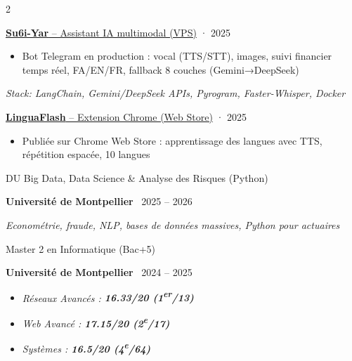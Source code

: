 \documentclass[7pt,a4paper,withhyper]{altacv}
\renewcommand{\cvevent}[4]{%
  {\large\color{emphasis}\raggedright #1\par}
  \smallskip\normalsize
  \ifstrequal{#2}{}{}{%
    \textbf{\color{accent}#2}%
  }%
  \ifstrequal{#4}{}{}{%
    \ifstrequal{#2}{}{}{\hspace{1.5em}}%
    {\small\cvLocationMarker~#4}%
  }%
  \ifstrequal{#3}{}{}{%
    \hfill{\small\cvDateMarker~#3}%
  }\par
}
\providecommand{\cvgithub}{github-username}
\begin{document}
\begin{paracol}{2}
{\large\color{emphasis}\raggedright\href{https://github.com/\cvgithub/su6i-yar}{\textbf{Su6i-Yar} -- Assistant IA multimodal (VPS)} {\small\color{LightGrey}· 2025}\par}
\vspace{0.1em}
\begin{itemize}[leftmargin=1.25em, nosep]
\item \justifying Bot Telegram en production : vocal (TTS/STT), images, suivi financier temps réel, FA/EN/FR, fallback 8 couches (Gemini→DeepSeek)
\end{itemize}
\noindent\textit{\small Stack: LangChain, Gemini/DeepSeek APIs, Pyrogram, Faster-Whisper, Docker}\par
\vspace{0.1em}\par\vspace{0.1em}

{\large\color{emphasis}\raggedright\href{https://github.com/\cvgithub/LinguaFlash}{\textbf{LinguaFlash} -- Extension Chrome (Web Store)} {\small\color{LightGrey}· 2025}\par}
\vspace{0.1em}
\begin{itemize}[leftmargin=1.25em, nosep]
\item \justifying Publiée sur Chrome Web Store : apprentissage des langues avec TTS, répétition espacée, 10 langues
\end{itemize}\par

\vspace{-0.5ex}

\cvevent{DU Big Data, Data Science \& Analyse des Risques (Python)}{Université de Montpellier}{2025 – 2026}{}
\textit{Econométrie, fraude, NLP, bases de données massives, Python pour actuaires}\par

\vspace{0.1em}\par\vspace{0.1em}

\cvevent{Master 2 en Informatique (Bac+5)}{Université de Montpellier}{2024 – 2025}{}
\begin{itemize}[leftmargin=1.25em, itemsep=0pt, parsep=0pt]
\item \textit{Réseaux Avancés : \textbf{16.33/20 (1\textsuperscript{er}/13)}}
\item \textit{Web Avancé : \textbf{17.15/20 (2\textsuperscript{e}/17)}}
\item \textit{Systèmes : \textbf{16.5/20 (4\textsuperscript{e}/64)}}
\end{itemize}\par

\end{paracol}
\end{document}
